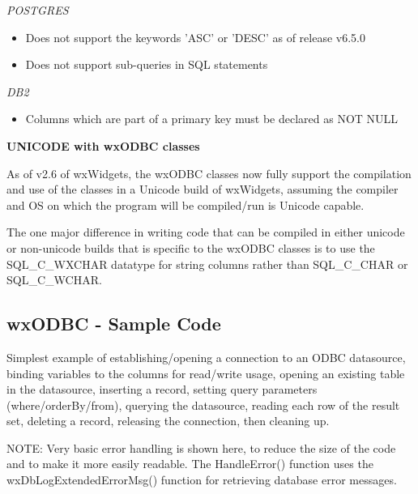 {\it POSTGRES}
\begin{itemize}\itemsep=0pt
\item Does not support the keywords 'ASC' or 'DESC' as of release v6.5.0
\item Does not support sub-queries in SQL statements
\end{itemize}

{\it DB2}
\begin{itemize}\itemsep=0pt
\item Columns which are part of a primary key must be declared as NOT NULL
\end{itemize}

{\bf UNICODE with wxODBC classes}

As of v2.6 of wxWidgets, the wxODBC classes now fully support the compilation 
and use of the classes in a Unicode build of wxWidgets, assuming the compiler 
and OS on which the program will be compiled/run is Unicode capable.

The one major difference in writing code that can be compiled in either 
unicode or non-unicode builds that is specific to the wxODBC classes is to 
use the SQL\_C\_WXCHAR datatype for string columns rather than SQL\_C\_CHAR or 
SQL\_C\_WCHAR.

\subsection{wxODBC - Sample Code}\label{wxodbcsamplecode1}

Simplest example of establishing/opening a connection to an ODBC datasource, 
binding variables to the columns for read/write usage, opening an 
existing table in the datasource, inserting a record, setting query parameters 
(where/orderBy/from), querying the datasource, reading each row of the 
result set, deleting a record, releasing the connection, then cleaning up.

NOTE: Very basic error handling is shown here, to reduce the size of the 
code and to make it more easily readable.  The HandleError() function uses the wxDbLogExtendedErrorMsg() function for retrieving database error messages.

